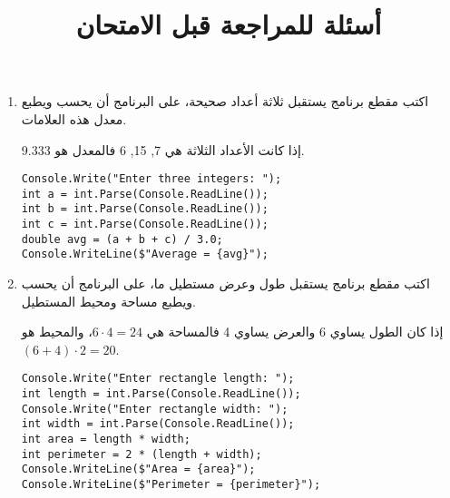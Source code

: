 \documentclass[12pt]{article}
\begin{document}
\title{أسئلة للمراجعة قبل الامتحان}

\maketitle
\thispagestyle{fancy}

\begin{enumerate}[itemsep=2em]

\item
	اكتب مقطع برنامج يستقبل ثلاثة أعداد صحيحة، على البرنامج أن يحسب ويطبع معدل هذه العلامات.\\
     \begin{boxExample}
     إذا كانت الأعداد الثلاثة هي 7, 15, 6 فالمعدل هو 9.333.
     \end{boxExample}

\ifwithsols
\begin{boxSolution}
\begin{english}
\begin{verbatim}
Console.Write("Enter three integers: ");
int a = int.Parse(Console.ReadLine());
int b = int.Parse(Console.ReadLine());
int c = int.Parse(Console.ReadLine());
double avg = (a + b + c) / 3.0;
Console.WriteLine($"Average = {avg}");
\end{verbatim}
\end{english}
\end{boxSolution}
\fi

\item
	اكتب مقطع برنامج يستقبل طول وعرض مستطيل ما، على البرنامج أن يحسب ويطبع مساحة ومحيط المستطيل. \\
    \begin{boxExample}
    إذا كان الطول يساوي 6 والعرض يساوي 4 فالمساحة هي $6 \cdot 4 = 24$، والمحيط هو $ (6 + 4) \cdot 2 = 20$.
    \end{boxExample}

\ifwithsols
\begin{boxSolution}
\begin{english}
\begin{verbatim}
Console.Write("Enter rectangle length: ");
int length = int.Parse(Console.ReadLine());
Console.Write("Enter rectangle width: ");
int width = int.Parse(Console.ReadLine());
int area = length * width;
int perimeter = 2 * (length + width);
Console.WriteLine($"Area = {area}");
Console.WriteLine($"Perimeter = {perimeter}");
\end{verbatim}
\end{english}
\end{boxSolution}
\clearpage
\fi


\end{enumerate}
\end{document}
